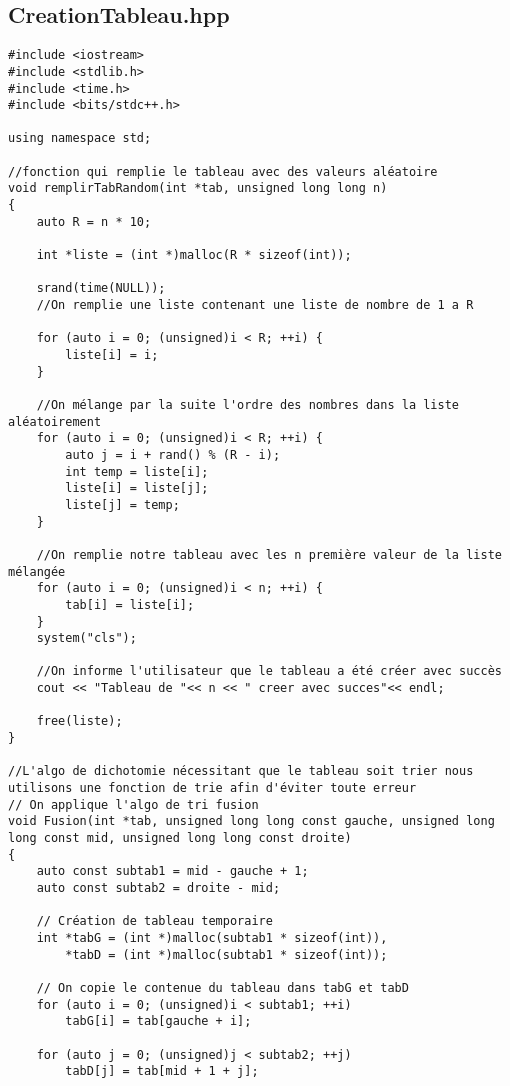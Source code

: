 \subsection{CreationTableau.hpp}
\begin{verbatim}
#include <iostream>
#include <stdlib.h>
#include <time.h>
#include <bits/stdc++.h>

using namespace std;

//fonction qui remplie le tableau avec des valeurs aléatoire
void remplirTabRandom(int *tab, unsigned long long n)
{
    auto R = n * 10;

    int *liste = (int *)malloc(R * sizeof(int));

    srand(time(NULL));
    //On remplie une liste contenant une liste de nombre de 1 a R

    for (auto i = 0; (unsigned)i < R; ++i) {
        liste[i] = i;
    }

    //On mélange par la suite l'ordre des nombres dans la liste aléatoirement
    for (auto i = 0; (unsigned)i < R; ++i) {
        auto j = i + rand() % (R - i);
        int temp = liste[i];
        liste[i] = liste[j];
        liste[j] = temp;
    }

    //On remplie notre tableau avec les n première valeur de la liste mélangée
    for (auto i = 0; (unsigned)i < n; ++i) {
        tab[i] = liste[i];
    }
    system("cls");

    //On informe l'utilisateur que le tableau a été créer avec succès
    cout << "Tableau de "<< n << " creer avec succes"<< endl;

    free(liste);
}

//L'algo de dichotomie nécessitant que le tableau soit trier nous utilisons une fonction de trie afin d'éviter toute erreur
// On applique l'algo de tri fusion
void Fusion(int *tab, unsigned long long const gauche, unsigned long long const mid, unsigned long long const droite)
{
    auto const subtab1 = mid - gauche + 1;
    auto const subtab2 = droite - mid;

    // Création de tableau temporaire
    int *tabG = (int *)malloc(subtab1 * sizeof(int)),
        *tabD = (int *)malloc(subtab1 * sizeof(int));

    // On copie le contenue du tableau dans tabG et tabD
    for (auto i = 0; (unsigned)i < subtab1; ++i)
        tabG[i] = tab[gauche + i];

    for (auto j = 0; (unsigned)j < subtab2; ++j)
        tabD[j] = tab[mid + 1 + j];


\end{verbatim}
